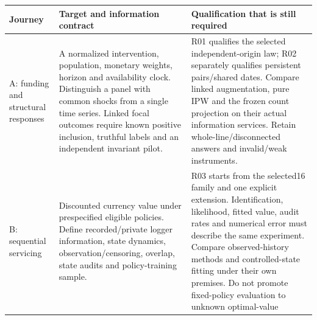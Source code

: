 \documentclass[
  11pt,
  a4paper,
]{article}
\begin{document}
\begin{longtable}[]{@{}lll@{}}
\toprule
\begin{minipage}[b]{0.30\columnwidth}\raggedright
Journey\strut
\end{minipage} & \begin{minipage}[b]{0.30\columnwidth}\raggedright
Target and information contract\strut
\end{minipage} & \begin{minipage}[b]{0.30\columnwidth}\raggedright
Qualification that is still required\strut
\end{minipage}\tabularnewline
\midrule
\endhead
\begin{minipage}[t]{0.30\columnwidth}\raggedright
A: funding and structural responses\strut
\end{minipage} & \begin{minipage}[t]{0.30\columnwidth}\raggedright
A normalized intervention, population, monetary weights, horizon and
availability clock. Distinguish a panel with common shocks from a single
time series. Linked focal outcomes require known positive inclusion,
truthful labels and an independent invariant pilot.\strut
\end{minipage} & \begin{minipage}[t]{0.30\columnwidth}\raggedright
R01 qualifies the selected independent-origin law; R02 separately
qualifies persistent pairs/shared dates. Compare linked augmentation,
pure IPW and the frozen count projection on their actual information
services. Retain whole-line/disconnected answers and invalid/weak
instruments.\strut
\end{minipage}\tabularnewline
\begin{minipage}[t]{0.30\columnwidth}\raggedright
B: sequential servicing\strut
\end{minipage} & \begin{minipage}[t]{0.30\columnwidth}\raggedright
Discounted currency value under prespecified eligible policies. Define
recorded/private logger information, state dynamics,
observation/censoring, overlap, state audits and policy-training
sample.\strut
\end{minipage} & \begin{minipage}[t]{0.30\columnwidth}\raggedright
R03 starts from the selected16 family and one explicit extension.
Identification, likelihood, fitted value, audit rates and numerical
error must describe the same experiment. Compare observed-history
methods and controlled-state fitting under their own premises. Do not
promote fixed-policy evaluation to unknown optimal-value

\end{minipage}
\end{longtable}
\end{document}
